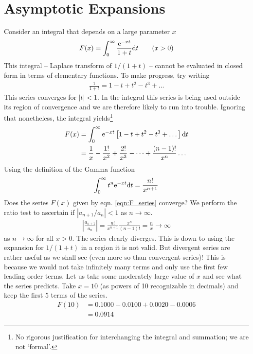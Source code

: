 \chapter{Asymptotic Expansions}
Consider an integral that depends on a large parameter $x$
\begin{gather}
	F(x) = \int_{0}^{\infty} \frac{\mathrm{e}^{-xt}}{1+t} \mathrm{d} t \qquad (x>0)
\end{gather}
This integral -- Laplace transform of $1/(1+t)$ -- cannot be evaluated in closed form in terms of elementary functions. To make progress, try writing
\begin{gather*}
	\frac{1}{1+t} = 1-t + t^2 - t^3 + \dots
\end{gather*}
This series converges for $|t|<1$. In the integral this series is being used outside its region of convergence and we are therefore likely to run into trouble. Ignoring that nonetheless, the integral yields\footnote{No rigorous justification for interchanging the integral and summation; we are not `formal'.}
\begin{align}
	F(x) &= \int_{0}^{\infty} \mathrm{e}^{-xt} \left[1-t + t^2 - t^3 + \dots\right] \mathrm{d} t \nonumber \\
	&= \frac{1}{x} - \frac{1!}{x^2} + \frac{2!}{x^3} - \dots + \frac{(n-1)!}{x^n}\dots \label{eqn:F_series}
\end{align}
Using the definition of the Gamma function 
\begin{gather*}
	\int_{0}^{\infty} t^n \mathrm{e}^{-xt} \mathrm{d} t = \frac{n!}{x^{n+1}}
\end{gather*}
Does the series $F(x)$ given by eqn. \ref{eqn:F_series} converge? We perform the ratio test to ascertain if $\left|a_{n+1}/a_n\right| < 1$ as $n\rightarrow \infty$.
\begin{gather}\label{eqn:gammafunc-ratio}
	\left|\frac{a_{n+1}}{a_n}\right| = \frac{n!}{x^{n+1}} \frac{x^n}{(n-1)!} = \frac{n}{x} \rightarrow \infty 
\end{gather}
as $n\rightarrow \infty$ for all $x > 0$. The series clearly diverges. This is down to using the expansion for $1/(1+t)$ in a region it is not valid. But divergent series are rather useful as we shall see (even more so than convergent series)! This is because we would not take infinitely many terms and only use the first few leading order terms. Let us take some moderately large value of $x$ and see what the series predicts. Take $x=10$ (as powers of 10 recognizable in decimals) and keep the first 5 terms of the series.
\begin{align*}
	F(10) &= 0.1000 - 0.0100 + 0.0020 - 0.0006 \\
	&= 0.0914 
\end{align*}
